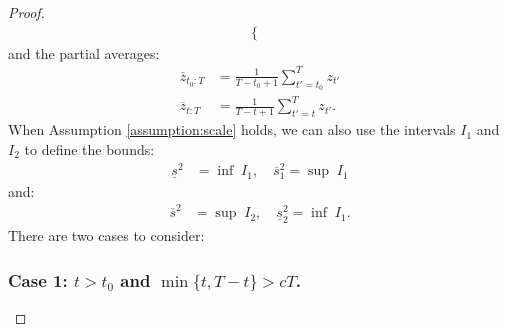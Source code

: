 \begin{proof}
\begin{align*}
\begin{cases}
    \end{cases}
\end{align*}
and the partial averages:
\begin{align*}
    \overline{z}_{t_0:T} &= \frac{1}{T-t_0+1} \sum_{t'=t_0}^T z_{t'} \\
    \overline{z}_{t:T} &= \frac{1}{T-t+1} \sum_{t'=t}^T z_{t'}.
\end{align*}
When Assumption \ref{assumption:scale} holds, we can also use the intervals $I_1$ and $I_2$ to define the bounds:
\begin{align} \label{eq:thm3-s_0-I-1-bd}
    \underline{s}^2 &= \inf \;I_1, \quad \overline{s}_1^2 = \sup \;I_1 
\end{align}
and:
\begin{align} \label{eq:thm3-s_0-I-2-bd}
    \overline{s}^2 &= \sup \;I_2, \quad \underline{s}_2^2 = \inf \;I_1. 
\end{align}
There are two cases to consider: 

\subsubsection*{Case 1: $t > t_0$ and $\min\{t, T-t\} > cT$.}


\end{proof}
